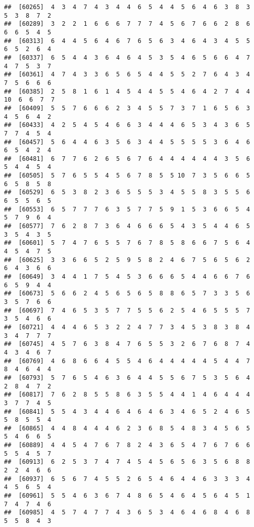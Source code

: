 \documentclass[
]{book}
\begin{document}
\begin{verbatim}
##  [60265]  4  3  4  7  4  3  4  4  6  5  4  4  5  6  4  6  3  8  3  5  3  8  7  2
##  [60289]  3  2  2  1  6  6  6  7  7  7  4  5  6  7  6  6  2  8  6  6  6  5  4  5
##  [60313]  6  4  4  5  6  4  6  7  6  5  6  3  4  6  4  3  4  5  5  6  5  2  6  4
##  [60337]  6  5  4  4  3  6  4  6  4  5  3  5  4  6  5  6  6  4  7  4  7  5  3  7
##  [60361]  4  7  4  3  3  6  5  6  5  4  4  5  5  2  7  6  4  3  4  7  5  6  6  6
##  [60385]  2  5  8  1  6  1  4  5  4  4  5  5  4  6  4  2  7  4  4 10  6  6  7  7
##  [60409]  5  5  7  6  6  6  2  3  4  5  5  7  3  7  1  6  5  6  3  4  5  6  4  2
##  [60433]  4  2  5  4  5  4  6  6  3  4  4  4  6  5  3  4  3  6  5  7  7  4  5  4
##  [60457]  5  6  4  4  6  3  5  6  3  4  4  5  5  5  5  3  6  4  6  6  5  4  2  4
##  [60481]  6  7  7  6  2  6  5  6  7  6  4  4  4  4  4  4  3  5  6  5  4  4  5  4
##  [60505]  5  7  6  5  5  4  5  6  7  8  5  5 10  7  3  5  6  6  5  6  5  8  5  8
##  [60529]  6  5  3  8  2  3  6  5  5  5  3  4  5  5  8  3  5  5  6  6  5  5  6  5
##  [60553]  6  5  7  7  7  6  3  5  7  7  5  9  1  5  3  6  6  5  4  5  7  9  6  4
##  [60577]  7  6  2  8  7  3  6  4  6  6  6  5  4  3  5  4  4  6  5  3  5  4  3  5
##  [60601]  5  7  4  7  6  5  5  7  6  7  8  5  8  6  6  7  5  6  4  4  5  4  7  5
##  [60625]  3  3  6  6  5  2  5  9  5  8  2  4  6  7  5  6  5  6  2  6  4  3  6  6
##  [60649]  3  4  4  1  7  5  4  5  3  6  6  6  5  4  4  6  6  7  6  6  5  9  4  4
##  [60673]  5  6  6  2  4  5  6  5  6  5  8  8  6  5  7  3  3  5  6  3  5  7  6  6
##  [60697]  7  4  6  5  3  5  7  7  5  5  6  2  5  4  6  5  5  5  7  3  5  4  6  6
##  [60721]  4  4  4  6  5  3  2  2  4  7  7  3  4  5  3  8  3  8  4  3  4  7  7  7
##  [60745]  4  5  7  6  3  8  4  7  6  5  5  3  2  6  7  6  8  7  4  4  3  4  6  7
##  [60769]  4  6  8  6  6  4  5  5  4  6  4  4  4  4  4  5  4  4  7  8  4  6  4  4
##  [60793]  5  7  6  5  4  6  3  6  4  4  5  5  6  7  5  3  5  6  4  2  8  4  7  2
##  [60817]  7  6  2  8  5  5  8  6  3  5  5  4  4  1  4  6  4  4  4  3  7  7  4  5
##  [60841]  5  5  4  3  4  4  6  4  6  4  6  3  4  6  5  2  4  6  5  5  8  5  5  4
##  [60865]  4  4  8  4  4  4  6  2  3  6  8  5  4  8  3  4  5  6  5  5  4  6  6  5
##  [60889]  4  4  5  4  7  6  7  8  2  4  3  6  5  4  7  6  7  6  6  5  5  4  5  7
##  [60913]  6  2  5  3  7  4  7  4  5  4  5  6  5  6  3  5  6  8  8  2  2  4  6  6
##  [60937]  6  5  6  7  4  5  5  2  6  5  4  6  4  4  6  3  3  3  4  4  5  6  5  4
##  [60961]  5  5  4  6  3  6  7  4  8  6  5  4  6  4  5  6  4  5  1  7  4  7  4  6
##  [60985]  4  5  7  4  7  7  4  3  6  5  3  4  6  4  6  8  4  6  8  5  5  8  4  3

\end{verbatim}
\end{document}
